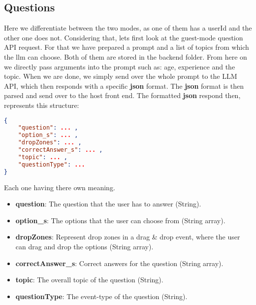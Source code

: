 \subsection{Questions}
Here we differentiate between the two modes, as one of them has a userId and the other one does not.
Considering that, lets first look at the guest-mode question API request.
For that we have prepared a prompt and a list of topics from which the llm can choose.
Both of them are stored in the backend folder.
From here on we directly pass arguments into the prompt such as: age, experience and the topic.
When we are done, we simply send over the whole prompt to the LLM API, which then responds with a specific \textbf{json} format.
The \textbf{json} format is then parsed and send over to the host front end.
The formatted \textbf{json} respond then, represents this structure:
\begin{lstlisting}[language=json,firstnumber=1]
{
    "question": ... ,
    "option_s": ... ,
    "dropZones": ... ,
    "correctAnswer_s": ... ,
    "topic": ... ,
    "questionType": ...
}
\end{lstlisting}
Each one having there own meaning.
\begin{itemize}
    \item \textbf{question}: The question that the user has to answer (String).
    \item \textbf{option\_s}: The options that the user can choose from (String array).
    \item \textbf{dropZones}: Represent drop zones in a drag \& drop event, where the user can drag and drop the options (String array).
    \item \textbf{correctAnswer\_s}: Correct answers for the question (String array).
    \item \textbf{topic}: The overall topic of the question (String).
    \item \textbf{questionType}: The event-type of the question (String).
\end{itemize}

